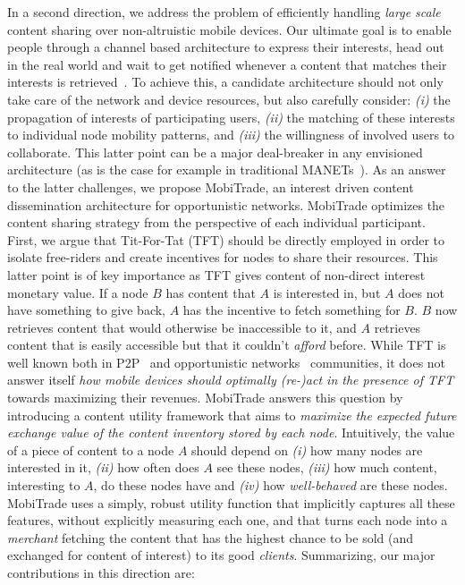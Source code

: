 In a second direction, we address the problem of efficiently handling \emph{large scale} content sharing over non-altruistic mobile devices. Our ultimate goal is to enable people through a channel based architecture to express their interests, head out in the real world and wait to get notified whenever a content that matches their interests is retrieved~\cite{CCN, MobiCent, IADTN, MoB, OptimalChannelChoice, ContentPlace, SocialCast2, SocialCast, BlueTorrent, TACODTN, Peoplenet}. To achieve this, a candidate architecture should not only take care of the network and device resources, but also carefully consider: \emph{(i)} the propagation of interests of participating users, \emph{(ii)} the matching of these interests to individual node mobility patterns, and \emph{(iii)} the willingness of involved users to collaborate. This latter point can be a major deal-breaker in any envisioned architecture (as is the case for example in traditional MANETs~\cite{NashEquilibria}). As an answer to the latter challenges, we propose MobiTrade, an interest driven content dissemination architecture for opportunistic networks. MobiTrade optimizes the content sharing strategy from the perspective of each individual participant. First, we argue that Tit-For-Tat (TFT) should be directly employed in order to isolate free-riders and create incentives for nodes to share their resources. This latter point is of key importance as TFT gives content of non-direct interest monetary value. If a node $B$ has content that $A$ is interested in, but $A$ does not have something to give back, $A$ has the incentive to fetch something for $B$. $B$ now retrieves content that would otherwise be inaccessible to it, and $A$ retrieves content that is easily accessible but that it couldn't \emph{afford} before. While TFT is well known both in P2P~\cite{BitHoc} and opportunistic networks~\cite{BarterDTN} communities, it does not answer itself \emph{how mobile devices should optimally (re-)act in the presence of TFT} towards maximizing their revenues. MobiTrade answers this question by introducing a content utility framework that aims to \emph{maximize the expected future exchange value of the content inventory stored by each node}. Intuitively, the value of a piece of content to a node $A$ should depend on \emph{(i)} how many nodes are interested in it, \emph{(ii)} how often does $A$ see these nodes, \emph{(iii)} how much content, interesting to $A$, do these nodes have and \emph{(iv)} how \emph{well-behaved} are these nodes. MobiTrade uses a simply, robust utility function that implicitly captures all these features, without explicitly measuring each one, and that turns each node into a \emph{merchant} fetching the content that has the highest chance to be sold (and exchanged for content of interest) to its good \emph{clients}. Summarizing, our major contributions in this direction are:
